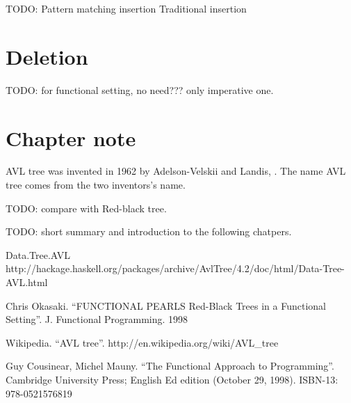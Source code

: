 \documentclass{article}
\begin{document}
TODO:
  Pattern matching insertion
  Traditional insertion
 

\section{Deletion}

  TODO: for functional setting, no need??? only imperative one.


\section{Chapter note}
AVL tree was invented in 1962 by Adelson-Velskii and Landis\cite{wiki}, 
\cite{TFATP}. The name AVL tree comes from the two inventors's name.

TODO: compare with Red-black tree.

  TODO: short summary and introduction to the following chatpers.

\begin{thebibliography}{99}

Data.Tree.AVL http://hackage.haskell.org/packages/archive/AvlTree/4.2/doc/html/Data-Tree-AVL.html

Chris Okasaki. ``FUNCTIONAL PEARLS Red-Black Trees in a Functional Setting''. J. Functional Programming. 1998

Wikipedia. ``AVL tree''. http://en.wikipedia.org/wiki/AVL\_tree

Guy Cousinear, Michel Mauny. ``The Functional Approach to Programming''. Cambridge University Press; English Ed edition (October 29, 1998). ISBN-13: 978-0521576819

\end{thebibliography}

\ifx\wholebook\relax\else
\end{document}
